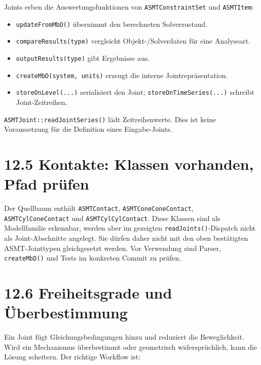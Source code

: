 \documentclass[
  12pt
]{book}
\providecommand{\tightlist}{%
  \setlength{\itemsep}{0pt}\setlength{\parskip}{0pt}}
\begin{document}
Joints erben die Auswertungsfunktionen von \texttt{ASMTConstraintSet}
und \texttt{ASMTItem}:

\begin{itemize}
\tightlist
\item
  \texttt{updateFromMbD()} übernimmt den berechneten Solverzustand.
\item
  \texttt{compareResults(type)} vergleicht Objekt-/Solverdaten für eine
  Analyseart.
\item
  \texttt{outputResults(type)} gibt Ergebnisse aus.
\item
  \texttt{createMbD(system,\ units)} erzeugt die interne
  Jointrepräsentation.
\item
  \texttt{storeOnLevel(...)} serialisiert den Joint;
  \texttt{storeOnTimeSeries(...)} schreibt Joint-Zeitreihen.
\end{itemize}

\texttt{ASMTJoint::readJointSeries()} lädt Zeitreihenwerte. Dies ist
keine Voraussetzung für die Definition eines Eingabe-Joints.

\hypertarget{kontakte-klassen-vorhanden-pfad-pruxfcfen}{%
\section{\texorpdfstring{{12.5} Kontakte: Klassen vorhanden, Pfad
prüfen}{12.5 Kontakte: Klassen vorhanden, Pfad prüfen}}\label{kontakte-klassen-vorhanden-pfad-pruxfcfen}}

Der Quellbaum enthält \texttt{ASMTContact},
\texttt{ASMTConeConeContact}, \texttt{ASMTCylConeContact} und
\texttt{ASMTCylCylContact}. Diese Klassen sind als Modellfamilie
erkennbar, werden aber im gezeigten \texttt{readJoints()}-Dispatch nicht
als Joint-Abschnitte angelegt. Sie dürfen daher nicht mit den oben
bestätigten ASMT-Jointtypen gleichgesetzt werden. Vor Verwendung sind
Parser, \texttt{createMbD()} und Tests im konkreten Commit zu prüfen.

\hypertarget{freiheitsgrade-und-uxfcberbestimmung}{%
\section{\texorpdfstring{{12.6} Freiheitsgrade und
Überbestimmung}{12.6 Freiheitsgrade und Überbestimmung}}\label{freiheitsgrade-und-uxfcberbestimmung}}

Ein Joint fügt Gleichungsbedingungen hinzu und reduziert die
Beweglichkeit. Wird ein Mechanismus überbestimmt oder geometrisch
widersprüchlich, kann die Lösung scheitern. Der richtige Workflow ist:
\end{document}
